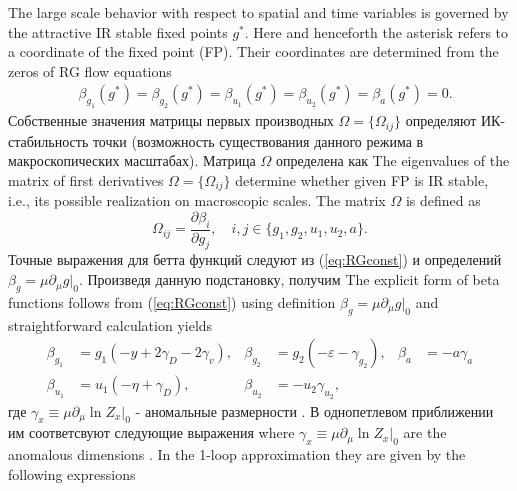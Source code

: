 \documentclass[12pt]{article}
\def\eps{\varepsilon}
\begin{document}
The large scale behavior with respect to spatial and time variables is
governed by the attractive IR stable fixed points $g^*$. Here and henceforth 
the asterisk refers to a coordinate of the fixed point (FP).
Their coordinates are
determined from the zeros of RG flow equations \cite{Vasiliev,Zinn,Amit} 
\begin{align}
  &\beta_{g_1} (g^{*}) =\beta_{g_2} (g^{*})= \beta_{u_1}
  (g^{*})=\beta_{u_2} (g^{*})=\beta_{a} (g^{*})=0.
  \label{eq:gen_beta}
\end{align}
Собственные значения матрицы первых производных $\Omega=\{\Omega_{ij}\}$ определяют ИК- стабильность точки (возможность существования данного режима в макроскопических масштабах).
Матрица $\Omega$ определена как
The eigenvalues of the matrix of first derivatives $\Omega=\{\Omega_{ij}\}$ 
determine whether given FP is IR stable, i.e., its possible realization on macroscopic scales.
 The matrix $\Omega$ is defined as
\begin{equation}
   \Omega_{ij} = \frac{\partial \beta_i}{\partial g_j},\quad
   i,j\in\{g_1,g_2,u_1,u_2,a\}.
   \label{eq:matrix}
\end{equation} 
Точные выражения для бетта функций следуют из (\ref{eq:RGconst}) и определений $\beta_g = \mu \partial_{\mu} g |_{0}$. Произведя данную подстановку, получим
The explicit form of beta functions follows from (\ref{eq:RGconst}) using definition $\beta_g = \mu \partial_{\mu} g |_{0}$ and 
straightforward calculation yields
\begin{align}
   \beta_{g_1} &= g_1 (-y + 2\gamma_D-2\gamma_v), 
      &\beta_{g_2}& =  g_2 (-\eps -\gamma_{g_2}),
      &\beta_{a} &= - a \gamma_{a}
      \nonumber \\
   \beta_{u_1} &= u_1(-\eta +\gamma_D), 
   &\beta_{u_2}&= - u_2 \gamma_{u_2}, 
  \label{eq:beta_functions}
\end{align}
где $\gamma_x \equiv \mu\partial_\mu \ln  Z_x |_0$  - аномальные размерности \cite{Vasiliev}.
В однопетлевом приближении им соответсвуют следующие выражения
where $\gamma_x \equiv \mu\partial_\mu \ln  Z_x |_0$ are
the anomalous dimensions \cite{Vasiliev}.  In the 1-loop approximation they are given
by the following expressions
\end{document}
